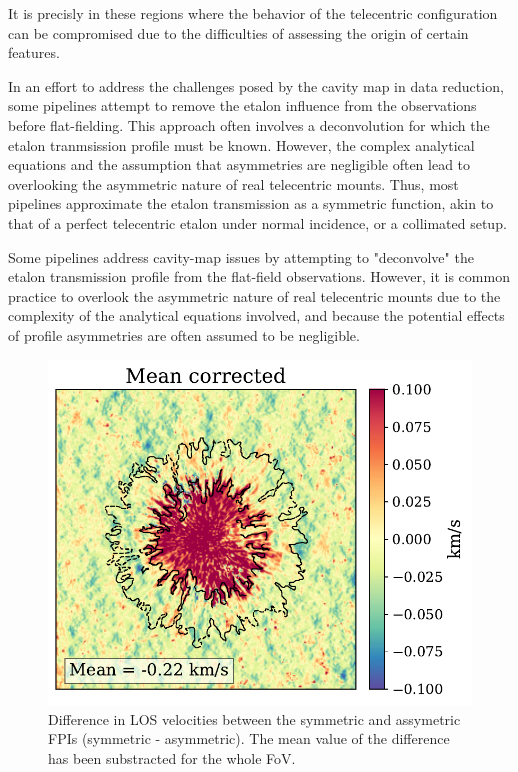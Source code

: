 It is precisly in these regions where the behavior of the telecentric configuration can be compromised due to the difficulties of assessing the origin of certain features. 

In an effort to address the challenges posed by the cavity map in data reduction, some pipelines attempt to remove the etalon influence from the observations before flat-fielding. This approach often involves a deconvolution for which the etalon tranmsission profile must be known. However, the complex analytical equations and the assumption that asymmetries are negligible often lead to overlooking the asymmetric nature of real telecentric mounts. Thus, most pipelines approximate the etalon transmission as a symmetric function, akin to that of a perfect telecentric etalon under normal incidence, or a collimated setup.

Some pipelines address cavity-map issues by attempting to "deconvolve" the etalon transmission profile from the flat-field observations. However, it is common practice to overlook the asymmetric nature of real telecentric mounts due to the complexity of the analytical equations involved, and because the potential effects of profile asymmetries are often assumed to be negligible.


\begin{figure}
  \begin{minipage}[c]{0.5\textwidth}
    \includegraphics[width=\textwidth]{figures/Mancha/vlos_sym_vs_asym.pdf}
  \end{minipage}\hfill\hfill
  \begin{minipage}[c]{0.47\textwidth}
    \caption[Assymetry effect in velocity calculations.]{
      Difference in LOS velocities between the symmetric and assymetric FPIs (symmetric - asymmetric). The mean value of the difference has been substracted for the whole FoV. \label{fig_mancha: vlos_asym_vs_sym}} 
  \end{minipage}
\end{figure}


